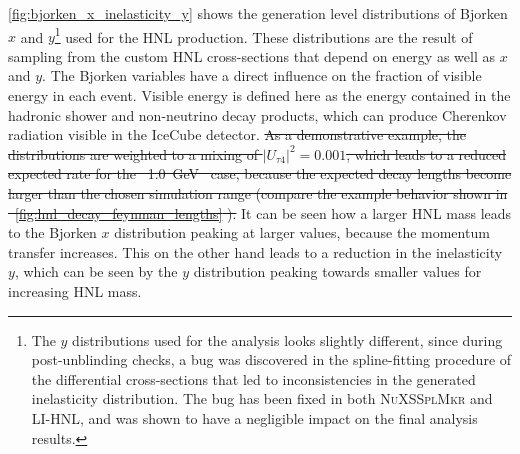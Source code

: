 \documentclass[
    aps,
    prd,
    reprint,
    amsmath,
    amssymb,
    nofootinbib,
    superscriptaddress,
    floatfix
]{revtex4-2}
\newcommand{\gev}{\giga\electronvolt}
\def\nomathut4{|U_{\tau4}|^2}
\providecommand{\DIFdeltex}[1]{{\protect\color{red}\sout{#1}}}                      %
\providecommand{\DIFdelbegin}{} %
\providecommand{\DIFdelend}{} %
\providecommand{\DIFdel}[1]{\texorpdfstring{\DIFdeltex{#1}}{}} %
\newcommand{\DIFscaledelfig}{0.5}
\newlength{\DIFdelgraphicswidth} %
\newlength{\DIFdelgraphicsheight} %
\newcommand{\DIFdelincludegraphics}[2][]{%
\sbox{\DIFdelgraphicsbox}{\DIFOincludegraphics[#1]{#2}}%
\settoboxwidth{\DIFdelgraphicswidth}{\DIFdelgraphicsbox} %
\settoboxtotalheight{\DIFdelgraphicsheight}{\DIFdelgraphicsbox} %
\scalebox{\DIFscaledelfig}{%
\parbox[b]{\DIFdelgraphicswidth}{\usebox{\DIFdelgraphicsbox}\\[-\baselineskip] \rule{\DIFdelgraphicswidth}{0em}}\llap{\resizebox{\DIFdelgraphicswidth}{\DIFdelgraphicsheight}{%
\setlength{\unitlength}{\DIFdelgraphicswidth}%
\begin{picture}(1,1)%
\thicklines\linethickness{2pt} %
{\color[rgb]{1,0,0}\put(0,0){\framebox(1,1){}}}%
{\color[rgb]{1,0,0}\put(0,0){\line( 1,1){1}}}%
{\color[rgb]{1,0,0}\put(0,1){\line(1,-1){1}}}%
\end{picture}%
}\hspace*{3pt}}} %
} %
\DeclareRobustCommand{\DIFdelbegin}{\DIFOdelbegin \let\includegraphics\DIFdelincludegraphics} %
\DeclareRobustCommand{\DIFdelend}{\DIFOaddend \let\includegraphics\DIFOincludegraphics} %
\begin{document}
\cref{fig:bjorken_x_inelasticity_y} shows the generation level distributions of Bjorken $x$ and $y$\footnote{The $y$ distributions used for the analysis looks slightly different, since during post-unblinding checks, a bug was discovered in the spline-fitting procedure of the differential cross-sections that led to inconsistencies in the generated inelasticity distribution. The bug has been fixed in both \textsc{NuXSSplMkr} and LI-HNL, and was shown to have a negligible impact on the final analysis results.} used for the HNL production. These distributions are the result of sampling from the custom HNL cross-sections that depend on energy as well as $x$ and $y$. The Bjorken variables have a direct influence on the fraction of visible energy in each event. Visible energy is defined here as the energy contained in the hadronic shower and non-neutrino decay products, which can produce Cherenkov radiation visible in the IceCube detector.
\DIFdelbegin \DIFdel{As a demonstrative example, the distributions are weighted to a mixing of $\nomathut4 = 0.001$, which leads to a reduced expected rate for the \mbox{%
\SI{1.0}{\gev} }\hskip0pt%
case, because the expected decay lengths become larger than the chosen simulation range (compare the example behavior shown in \mbox{%
\cref{fig:hnl_decay_feynman_lengths}}\hskip0pt%
).
}\DIFdelend %
It can be seen how a larger HNL mass leads to the Bjorken $x$ distribution peaking at larger values, because the momentum transfer increases. This on the other hand leads to a reduction in the inelasticity $y$, which can be seen by the $y$ distribution peaking towards smaller values for increasing HNL mass.
\end{document}
